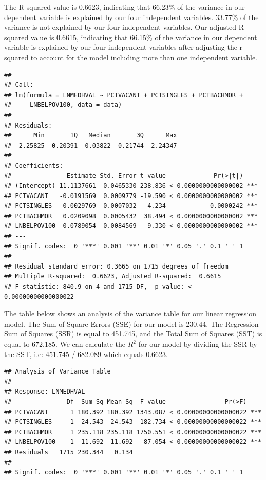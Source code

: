 \documentclass[
]{article}
\begin{document}
The R-squared value is 0.6623, indicating that 66.23\% of the variance
in our dependent variable is explained by our four independent
variables. 33.77\% of the variance is not explained by our four
independent variables. Our adjusted R-squared value is 0.6615,
indicating that 66.15\% of the variance in our dependent variable is
explained by our four independent variables after adjusting the
r-squared to account for the model including more than one independent
variable.

\begin{verbatim}
## 
## Call:
## lm(formula = LNMEDHVAL ~ PCTVACANT + PCTSINGLES + PCTBACHMOR + 
##     LNBELPOV100, data = data)
## 
## Residuals:
##      Min       1Q   Median       3Q      Max 
## -2.25825 -0.20391  0.03822  0.21744  2.24347 
## 
## Coefficients:
##               Estimate Std. Error t value             Pr(>|t|)    
## (Intercept) 11.1137661  0.0465330 238.836 < 0.0000000000000002 ***
## PCTVACANT   -0.0191569  0.0009779 -19.590 < 0.0000000000000002 ***
## PCTSINGLES   0.0029769  0.0007032   4.234            0.0000242 ***
## PCTBACHMOR   0.0209098  0.0005432  38.494 < 0.0000000000000002 ***
## LNBELPOV100 -0.0789054  0.0084569  -9.330 < 0.0000000000000002 ***
## ---
## Signif. codes:  0 '***' 0.001 '**' 0.01 '*' 0.05 '.' 0.1 ' ' 1
## 
## Residual standard error: 0.3665 on 1715 degrees of freedom
## Multiple R-squared:  0.6623, Adjusted R-squared:  0.6615 
## F-statistic: 840.9 on 4 and 1715 DF,  p-value: < 0.00000000000000022
\end{verbatim}

The table below shows an analysis of the variance table for our linear
regression model. The Sum of Square Errors (SSE) for our model is
230.44. The Regression Sum of Squares (SSR) is equal to 451.745, and the
Total Sum of Squares (SST) is equal to 672.185. We can calculate the
\(R^2\) for our model by dividing the SSR by the SST, i.e: 451.745 /
682.089 which equals 0.6623.

\begin{verbatim}
## Analysis of Variance Table
## 
## Response: LNMEDHVAL
##               Df  Sum Sq Mean Sq  F value                Pr(>F)    
## PCTVACANT      1 180.392 180.392 1343.087 < 0.00000000000000022 ***
## PCTSINGLES     1  24.543  24.543  182.734 < 0.00000000000000022 ***
## PCTBACHMOR     1 235.118 235.118 1750.551 < 0.00000000000000022 ***
## LNBELPOV100    1  11.692  11.692   87.054 < 0.00000000000000022 ***
## Residuals   1715 230.344   0.134                                   
## ---
## Signif. codes:  0 '***' 0.001 '**' 0.01 '*' 0.05 '.' 0.1 ' ' 1
\end{verbatim}
\end{document}
